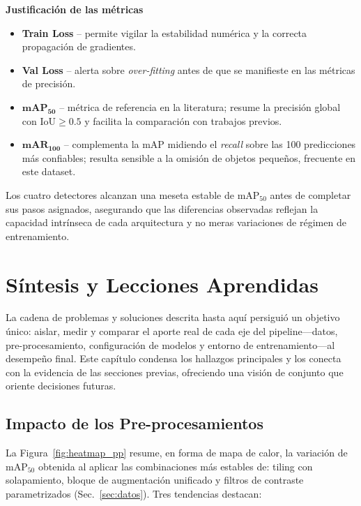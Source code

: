 \textbf{Justificación de las métricas}

\begin{itemize}
  \item \textbf{Train Loss} – permite vigilar la estabilidad numérica y la correcta propagación de gradientes.
  \item \textbf{Val Loss} – alerta sobre \emph{over-fitting} antes de que se manifieste en las métricas de precisión.
  \item \(\mathbf{mAP_{50}}\) – métrica de referencia en la literatura; resume la precisión global con \(\text{IoU}\ge0.5\) y facilita la comparación con trabajos previos.
  \item \(\mathbf{mAR_{100}}\) – complementa la mAP midiendo el \emph{recall} sobre las 100 predicciones más confiables; resulta sensible a la omisión de objetos pequeños, frecuente en este dataset.
\end{itemize}

Los cuatro detectores alcanzan una meseta estable de \(\text{mAP}_{50}\) antes de completar sus pasos asignados, asegurando que las diferencias observadas reflejan la capacidad intrínseca de cada arquitectura y no meras variaciones de régimen de entrenamiento.

\section{Síntesis y Lecciones Aprendidas}\label{sec:sintesis}

La cadena de problemas y soluciones descrita hasta aquí persiguió un objetivo único: aislar, medir y comparar el aporte real de cada eje del pipeline—datos, pre-procesamiento, configuración de modelos y entorno de entrenamiento—al desempeño final.
Este capítulo condensa los hallazgos principales y los conecta con la evidencia de las secciones previas, ofreciendo una visión de conjunto que oriente decisiones futuras.

\subsection{Impacto de los Pre-procesamientos}

La Figura~\ref{fig:heatmap_pp} resume, en forma de mapa de calor, la variación de \(\text{mAP}_{50}\) obtenida al aplicar las combinaciones más estables de: tiling con solapamiento, bloque de augmentación unificado y filtros de contraste parametrizados (Sec.~\ref{sec:datos}).
Tres tendencias destacan:

